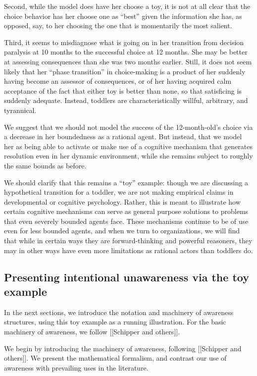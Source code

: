 \documentclass[
11pt,
titlepage,
reqno,
]{article}%
\theoremstyle{definition}
\begin{document}
Second, while the model does have her choose a toy, it is not at all clear that the choice behavior has her choose one as ``best'' given the information she has, as opposed, say, to her choosing the one that is momentarily the most salient.

Third, it seems to misdiagnose what is going on in her transition from decision paralysis at 10 months to the successful choice at 12 months. She may be better at assessing consequences than she was two months earlier. Still, it does not seem likely that her ``phase transition'' in choice-making is a product of her suddenly having become an assessor of consequences, or of her having acquired calm acceptance of the fact that either toy is better than none, so that satisficing is suddenly adequate. Instead, toddlers are characteristically willful, arbitrary, and tyrannical. 

We suggest that we should not model the success of the 12-month-old's choice via a decrease in her boundedness as a rational agent. But instead, that we model her as being able to activate or make use of a cognitive mechanism that generates resolution even in her dynamic environment, while she remains subject to roughly the same bounds as before.

We should clarify that this remains a ``toy'' example: though we are discussing a hypothetical transition for a toddler, we are not making empirical claims in developmental or cognitive psychology. Rather, this is meant to illustrate how certain cognitive mechanisms can serve as general purpose solutions to problems that even severely bounded agents face. These mechanisms continue to be of use even for less bounded agents, and when we turn to organizations, we will find that while in certain ways they are forward-thinking and powerful reasoners, they may in other ways have even more limitations as rational actors than toddlers do.

\subsection{Presenting intentional unawareness via the toy example}
In the next sections, we introduce the notation and machinery of awareness structures, using this toy example as a running illustration. For the basic machinery of awareness, we follow [[Schipper and others]]. 

We begin by introducing the machinery of awareness, following [[Schipper and others]]. We present the mathematical formalism, and contrast our use of awareness with prevailing uses in the literature.
\end{document}

